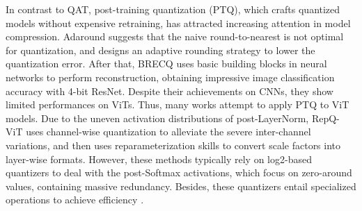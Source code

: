 In contrast to QAT, post-training quantization (PTQ), which crafts quantized models without expensive retraining, has attracted increasing attention in model compression. Adaround \cite{DBLP:conf/icml/NagelABLB20} suggests that the naive round-to-nearest is not optimal for quantization, and designs an adaptive rounding strategy to lower the quantization error. After that, BRECQ \cite{li2020brecq} uses basic building blocks in neural networks to perform reconstruction, obtaining impressive image classification accuracy with 4-bit ResNet.
Despite their achievements on CNNs, they show limited performances on ViTs. Thus, many works \cite{DBLP:conf/ijcai/LinZSLZ22, li2023repq} attempt to apply PTQ to ViT models. Due to the uneven activation distributions of post-LayerNorm, RepQ-ViT \cite{li2023repq} uses channel-wise quantization to alleviate the severe inter-channel variations, and then uses reparameterization skills to convert scale factors into layer-wise formats. However, these methods typically rely on log2-based quantizers to deal with the post-Softmax activations, which focus on zero-around values, containing massive redundancy. Besides, these quantizers entail specialized operations to achieve efficiency \cite{lee2017lognet,DBLP:conf/ijcai/LinZSLZ22}.